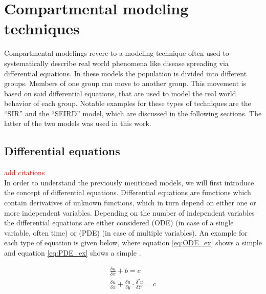 \section{Compartmental modeling techniques}
Compartmental modelings revere to a modeling technique often used to systematically describe real world phenomena
like disease spreading via differential equations\cite{compartementMod}. In these models the population is divided into different groups. 
Members of one group can move to another group. This movement is based on said differential equations, that are used to model the real
world behavior of each group. Notable examples for these types of techniques are the ``SIR'' and the ``SEIRD'' model, which are discussed in
the following sections. The latter of the two models was used in this work.


\subsection{Differential equations}
\textcolor{red}{add citations}\\ %
In order to understand the previously mentioned models, we will first introduce the concept of differential equations.
Differential equations are functions which contain derivatives of unknown functions, which in turn depend
on either one or more independent variables. Depending on the number of independent variables the differential
equations are either considered  (ODE) (in case of a single variable, often time) or
 (PDE) (in case of multiple variables). An example for each type of equation
is given below, where equation \ref*{eq:ODE_ex} shows a simple  and equation \ref*{eq:PDE_ex} shows a
simple .\newline

\begin{align}
	\frac{\delta u}{\delta x} + b = c \label{eq:ODE_ex}\\
	\frac{\delta u}{\delta x} + \frac{\delta u}{\delta y} \cdot \frac{\delta^2 u}{\delta z^2} = c \label{eq:PDE_ex}
\end{align}

